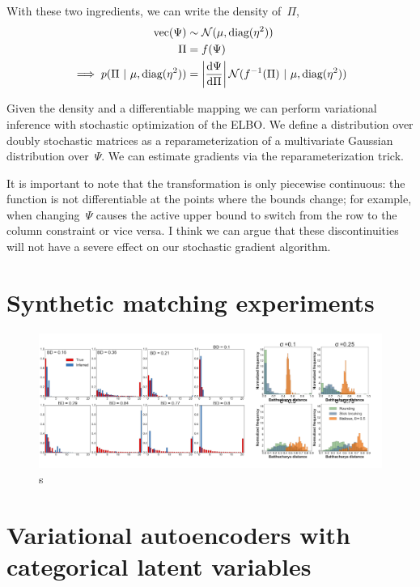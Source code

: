 \documentclass{article}
\begin{document}
With these two ingredients, we can write the density of~${\Pi}$,
\begin{align}
  \text{vec} (\Psi) &\sim \mathcal{N}(\mu, \textrm{diag}(\eta^2))
  \\
  {\Pi} &= f(\Psi) \\
  \implies
  p(\Pi ~\vert~ \mu, \textrm{diag}(\eta^2)) &= \left|\frac{\mathrm{d} \Psi }{\mathrm{d} {\Pi}} \right|
  \mathcal{N}(f^{-1}({\Pi}) ~\vert~ \mu, \textrm{diag}(\eta^2))
\end{align}

Given the density and a differentiable mapping we can perform
variational inference with stochastic optimization of the ELBO.
We define a distribution over doubly stochastic matrices as a
reparameterization of a multivariate Gaussian distribution
over~$\Psi$. We can estimate gradients via the reparameterization
trick.

It is important to note that the transformation is only piecewise
continuous: the function is not differentiable at the points where
the bounds change; for example, when changing~$\Psi$ causes the
active upper bound to switch from the row to the column constraint
or vice versa.  I think we can argue that these discontinuities
will not have a severe effect on our stochastic gradient algorithm.



\section{Synthetic matching experiments}

\begin{figure}[t]
  \centering
  \includegraphics[width=1.0\textwidth]{../figures/figure5.pdf} 
  \caption{s
  }
\label{fig:transforms}
\end{figure}

\label{sec:synthetic}

\section{Variational autoencoders with categorical latent variables}
\end{document}
